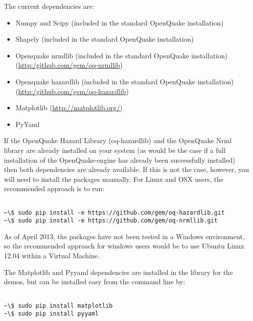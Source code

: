 The current dependencies are:
\begin{itemize}
\item Numpy and Scipy (included in the standard OpenQuake installation)
\item Shapely (included in the standard OpenQuake installation)
\item Openquake nrmllib (included in the standard OpenQuake installation) 
    \hfill \\ (\href{http:/github.com/gem/oq-nrmllib}{http:/github.com/gem/oq-nrmllib}) 
\item Openquake hazardlib (included in the standard OpenQuake installation) 
    \hfill \\ (\href{http:/github.com/gem/oq-hazardlib}{http:/github.com/gem/oq-hazardlib})
\item Matplotlib (\href{http://matplotlib.org/}{http://matplotlib.org/})
\item PyYaml
\end{itemize}

If the OpenQuake Hazard Library (oq-hazardlib) and the OpenQuake Nrml library are already installed on your system (as would be the case if a full installation of the OpenQuake-engine has already been successfully installed) then both dependencies are already available. If this is not the case, however, you will need to install the packages manually. For Linux and OSX users, the recommended approach is to run:

\begin{Verbatim}[frame=single, commandchars=\\\{\}, fontsize=\scriptsize]

~\$ sudo pip install -e https://github.com/gem/oq-hazardlib.git
~\$ sudo pip install -e https://github.com/gem/oq-nrmllib.git

\end{Verbatim}

As of April 2013, the packages have not been tested in a Windows environment, so the recommended approach for windows users would be to use Ubuntu Linux 12.04 within a Virtual Machine.


The Matplotlib and Pyyaml dependencies are installed in the library for the demos, but can be installed easy from the command line by:

\begin{Verbatim}[frame=single, commandchars=\\\{\}, fontsize=\scriptsize]

~\$ sudo pip install matplotlib
~\$ sudo pip install pyyaml

\end{Verbatim}

